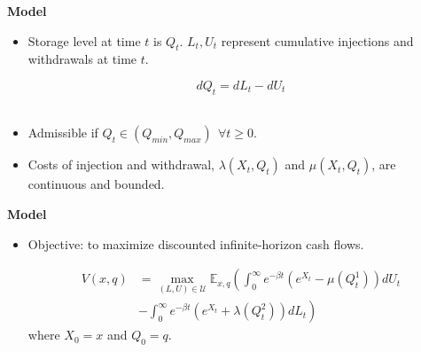 \documentclass{beamer}
\begin{document}
\begin{frame}
{\bf Model}
\begin{itemize}
\item Storage level at time $t$ is $Q_t$. $L_t,U_t$ represent cumulative injections and withdrawals at time $t$.

\begin{equation*}
  dQ_t = dL_t - dU_t
\end{equation*}
\\
\item Admissible if $Q_t \in (Q_{min},Q_{max})~~ \forall t \geq 0$.

\item Costs of injection and withdrawal, $\lambda(X_t,Q_t)$ and $\mu(X_t,Q_t)$, are continuous and bounded.

\end{itemize}

\end{frame}


\begin{frame}
{\bf Model}
\begin{itemize}
  \item Objective: to maximize discounted infinite-horizon cash flows.

  \begin{equation}
  \begin{split}
  V(x,q) &= \max_{(L,U) \in \mathcal{U}} \mathbb{E}_{x,q} \left(\int_{0}^{\infty} e^{-\beta t}(e^{X_t} - \mu(Q^1_t))dU_t\right.\\
  &\left.- \int_{0}^{\infty}e^{-\beta t}(e^{X_t} + \lambda(Q^2_t))dL_t\right)
  \end{split}
\end{equation}
where $X_0 =x$ and $Q_0 = q$. %
%
  
\end{itemize}
\end{frame}
\end{document}
